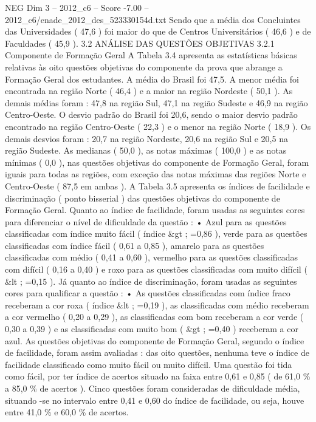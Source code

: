 \begin{textsample}{NEG Dim 3 – 2012\_c6 – Score -7.00 – 2012\_c6/enade\_2012\_des\_523330154d.txt}
Sendo que a média dos Concluintes das Universidades ( 47,6 ) foi maior do que de Centros Universitários ( 46,6 ) e de Faculdades ( 45,9 ). 3.2 ANÁLISE DAS QUESTÕES OBJETIVAS 3.2.1 Componente de Formação Geral A Tabela 3.4 apresenta as estatísticas básicas relativas às oito questões objetivas do componente da prova que abrange a Formação Geral dos estudantes.
A média do Brasil foi 47,5.
A menor média foi encontrada na região Norte ( 46,4 ) e a maior na região Nordeste ( 50,1 ).
As demais médias foram : 47,8 na região Sul, 47,1 na região Sudeste e 46,9 na região Centro-Oeste.
O desvio padrão do Brasil foi 20,6, sendo o maior desvio padrão encontrado na região Centro-Oeste ( 22,3 ) e o menor na região Norte ( 18,9 ).
Os demais desvios foram : 20,7 na região Nordeste, 20,6 na região Sul e 20,5 na região Sudeste.
As medianas ( 50,0 ), as notas máximas ( 100,0 ) e as notas mínimas ( 0,0 ), nas questões objetivas do componente de Formação Geral, foram iguais para todas as regiões, com exceção das notas máximas das regiões Norte e Centro-Oeste ( 87,5 em ambas ).
A Tabela 3.5 apresenta os índices de facilidade e discriminação ( ponto bisserial ) das questões objetivas do componente de Formação Geral.
Quanto ao índice de facilidade, foram usadas as seguintes cores para diferenciar o nível de dificuldade da questão : • Azul para as questões classificadas com índice muito fácil ( índice \&gt ; =0,86 ), verde para as questões classificadas com índice fácil ( 0,61 a 0,85 ), amarelo para as questões classificadas com médio ( 0,41 a 0,60 ), vermelho para as questões classificadas com difícil ( 0,16 a 0,40 ) e roxo para as questões classificadas com muito difícil ( \&lt ; =0,15 ).
Já quanto ao índice de discriminação, foram usadas as seguintes cores para qualificar a questão : • As questões classificadas com índice fraco receberam a cor roxa ( índice \&lt ; =0,19 ), as classificadas com médio receberam a cor vermelho ( 0,20 a 0,29 ), as classificadas com bom receberam a cor verde ( 0,30 a 0,39 ) e as classificadas com muito bom ( \&gt ; =0,40 ) receberam a cor azul.
As questões objetivas do componente de Formação Geral, segundo o índice de facilidade, foram assim avaliadas : das oito questões, nenhuma teve o índice de facilidade classificado como muito fácil ou muito difícil.
Uma questão foi tida como fácil, por ter índice de acertos situado na faixa entre 0,61 e 0,85 ( de 61,0 \% a 85,0 \% de acertos ).
Cinco questões foram consideradas de dificuldade média, situando -se no intervalo entre 0,41 e 0,60 do índice de facilidade, ou seja, houve entre 41,0 \% e 60,0 \% de acertos.

\end{textsample}
